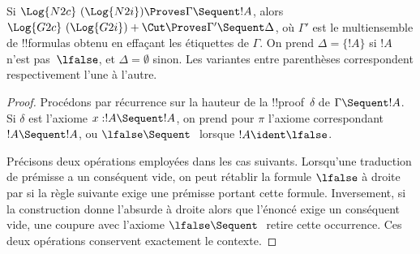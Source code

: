 \documentclass[../../../include/open-logic-section]{subfiles}
\begin{document}


\begin{prop}
Si $\Log{N2c}\ (\Log{N2i}) \Proves \Gamma \Sequent !A$,
alors $\Log{G2c}\ (\Log{G2i}) + \Cut \Proves
\Gamma' \Sequent \Delta$, où $\Gamma'$ est le
multiensemble de !!{formula}s obtenu en effaçant les
étiquettes de $\Gamma$. On prend $\Delta = \{!A\}$
si $!A$ n'est pas~$\lfalse$, et $\Delta = \emptyset$
sinon. Les variantes entre parenthèses correspondent
respectivement l'une à l'autre.
\end{prop}

\begin{proof}
Procédons par récurrence sur la hauteur de la
!!{proof}~$\delta$ de $\Gamma \Sequent !A$.
Si $\delta$ est l'axiome $x:!A \Sequent !A$,
on prend pour $\pi$ l'axiome correspondant
$!A \Sequent !A$, ou $\lfalse \Sequent \ $
lorsque $!A \ident \lfalse$.

Précisons deux opérations employées dans les cas suivants.
Lorsqu'une traduction de prémisse a un conséquent vide,
on peut rétablir la formule $\lfalse$ à droite par
\RightR{\Weakening} si la règle suivante exige une
prémisse portant cette formule. Inversement, si la
construction donne l'absurde à droite alors que
l'énoncé exige un conséquent vide, une coupure avec
l'axiome $\lfalse \Sequent \ $ retire cette occurrence.
Ces deux opérations conservent exactement le contexte.


\end{proof}
\end{document}
